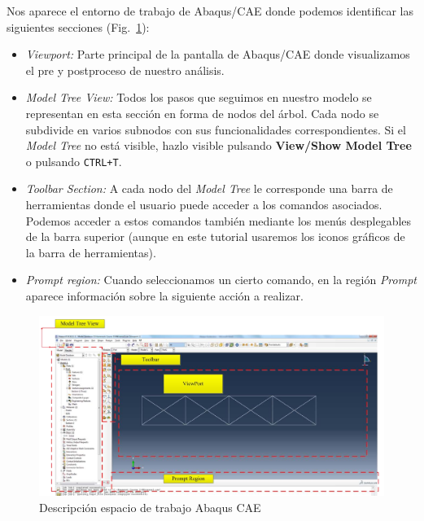 Nos aparece el entorno de trabajo de Abaqus/CAE donde podemos
identificar las siguientes secciones (Fig.~\ref{figu11}):
\begin{itemize}
\item \textit{Viewport:} Parte principal de la pantalla de Abaqus/CAE
  donde visualizamos el pre y postproceso de nuestro análisis.
\item \textit{Model Tree View:} Todos los pasos que seguimos en
  nuestro modelo se representan en esta sección en forma de nodos del
  árbol. Cada nodo se subdivide en varios subnodos con sus
  funcionalidades correspondientes. Si el \textit{Model Tree} no está
  visible, hazlo visible pulsando \textbf{View/Show Model Tree} o
  pulsando \texttt{CTRL+T}.
\item \textit{Toolbar Section:} A cada nodo del \textit{Model Tree} le
  corresponde una barra de herramientas donde el usuario puede acceder
  a los comandos asociados. Podemos acceder a estos comandos también
  mediante los menús desplegables de la barra superior (aunque en este
  tutorial usaremos los iconos gráficos de la barra de herramientas).
\item \textit{Prompt region:} Cuando seleccionamos un cierto comando,
  en la región \textit{Prompt} aparece información sobre la siguiente
  acción a realizar.
\end{itemize}

\begin{figure}[H]
  \begin{center}
    \includegraphics[width=1.05\textwidth]{./body/images/imagen11}
  \end{center}
  \caption{Descripción espacio de trabajo Abaqus CAE}
  \label{figu11}
\end{figure}




